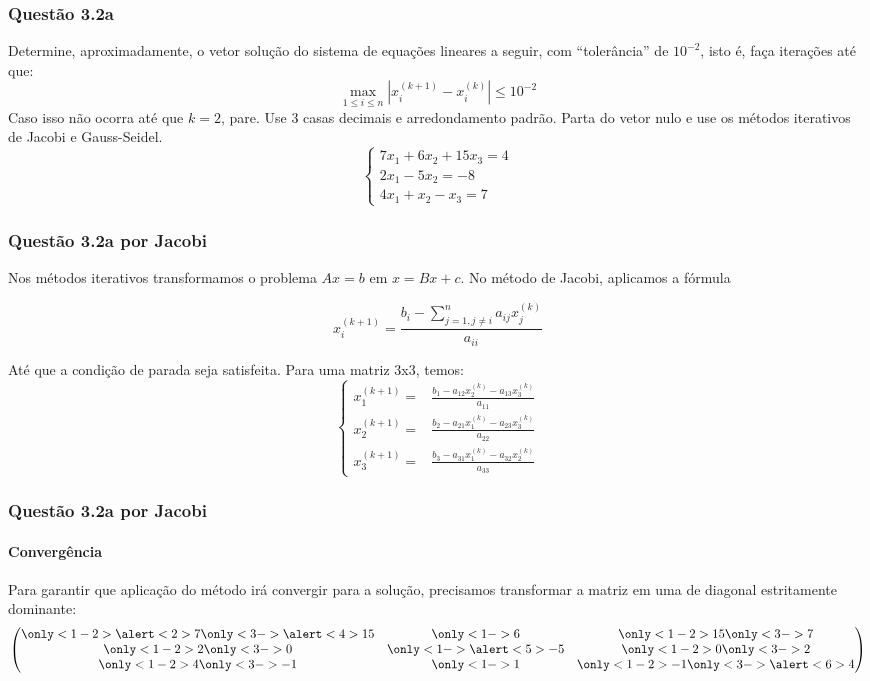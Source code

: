 \begin{frame}
\frametitle{Questão 3.2a}
Determine, aproximadamente, o vetor solução do sistema de equações lineares a seguir, com ``tolerância'' de $10^{-2}$, isto é, faça iterações até que:
\[
\max_{1 \le i \le n}\left| x_i^{(k+1)} - x_i^{(k)} \right| \le 10^{-2}
\]
Caso isso não ocorra até que $k = 2$, pare. Use 3 casas decimais e arredondamento padrão.
%
Parta do vetor nulo e use os métodos iterativos de Jacobi e Gauss-Seidel.
\[
\left\{
\begin{array}{l}
7 x_1 + 6x_2 + 15 x_3 = 4\\
2 x_1 -5x_2 = -8\\
4 x_1 +x_2 - x_3 = 7
\end{array}
\right.
\]
\end{frame}

\begin{frame}
\frametitle{Questão 3.2a por Jacobi}
Nos métodos iterativos transformamos o problema $Ax = b$ em $x = Bx + c$. 
%
No método de Jacobi, aplicamos a fórmula

\[
x_i^{(k+1)} = \frac{b_i - \sum_{j = 1, j \ne i}^{n}a_{ij}x_j^{(k)}}{a_{ii}}
\]

Até que a condição de parada seja satisfeita. 
%
Para uma matriz 3x3, temos:
\[
\left\{
\begin{array}{ll}
x_1^{(k+1)} = &\frac{b_1-a_{12}x_2^{(k)}-a_{13}x_3^{(k)}}{a_{11}}\\
x_2^{(k+1)} = &\frac{b_2-a_{21}x_1^{(k)}-a_{23}x_3^{(k)}}{a_{22}}\\
x_3^{(k+1)} = &\frac{b_3-a_{31}x_1^{(k)}-a_{32}x_2^{(k)}}{a_{33}}
\end{array}
\right.
\]
\end{frame}

\begin{frame}
\frametitle{Questão 3.2a por Jacobi}
\framesubtitle{Convergência}
Para garantir que aplicação do método irá convergir para a solução, precisamos transformar a matriz em uma de diagonal estritamente dominante:
\[
\begin{pmatrix}
\only<1-2>{\alert<2>{7}}\only<3->{\alert<4>{15}} & 
  \only<1->{6} & 
  \only<1-2>{15}\only<3->{7}
  \\
%
\only<1-2>{2}\only<3->{0} & 
  \only<1->{\alert<5>{-5}} & 
  \only<1-2>{0}\only<3->{2}\\
%
\only<1-2>{4}\only<3->{-1} & 
  \only<1->{1 }& 
  \only<1-2>{-1}\only<3->{\alert<6>{4}}
\end{pmatrix}
\]

\end{frame}

